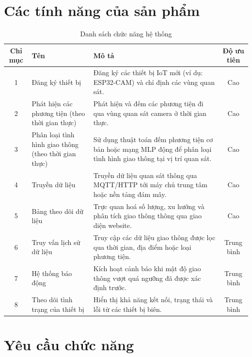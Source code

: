 \section{Các tính năng của sản phẩm}
\begin{table}[H]
    \centering
    \caption{Danh sách chức năng hệ thống}
    \renewcommand{\arraystretch}{1.4} %
    \begin{tabular}{|c|p{4cm}|p{8cm}|c|}
    \hline
    \textbf{Chỉ mục} & \textbf{Tên} & \textbf{Mô tả} & \textbf{Độ ưu tiên} \\ \hline
    1 & Đăng ký thiết bị & Đăng ký các thiết bị IoT mới (ví dụ: ESP32-CAM) và chỉ định các vùng quan sát. & Cao \\ \hline
    2 & Phát hiện các phương tiện (theo thời gian thực) & Phát hiện và đếm các phương tiện đi qua vùng quan sát camera ở thời gian thực. & Cao \\ \hline
    3 & Phân loại tình hình giao thông (theo thời gian thực) & Sử dụng thuật toán đếm phương tiện cơ bản hoặc mạng MLP động để phân loại tình hình giao thông tại vị trí quan sát. & Cao \\ \hline
    4 & Truyền dữ liệu & Truyền dữ liệu quan sát thông qua MQTT/HTTP tới máy chủ trung tâm hoặc nền tảng đám mây. & Cao \\ \hline
    5 & Bảng theo dõi dữ liệu & Trực quan hoá số lượng, xu hướng và phân tích giao thông thông qua giao diện website. & Cao \\ \hline
    6 & Truy vấn lịch sử dữ liệu & Truy cập các dữ liệu giao thông được lọc qua thời gian, địa điểm hoặc loại phương tiện. & Trung bình \\ \hline
    7 & Hệ thống báo động & Kích hoạt cảnh báo khi mật độ giao thông vượt quá ngưỡng đã được xác định trước. & Trung bình \\ \hline
    8 & Theo dõi tình trạng của thiết bị & Hiển thị khả năng kết nối, trạng thái và lỗi từ các thiết bị biên. & Trung bình \\ \hline
    \end{tabular}
\end{table}
    
\section{Yêu cầu chức năng}

